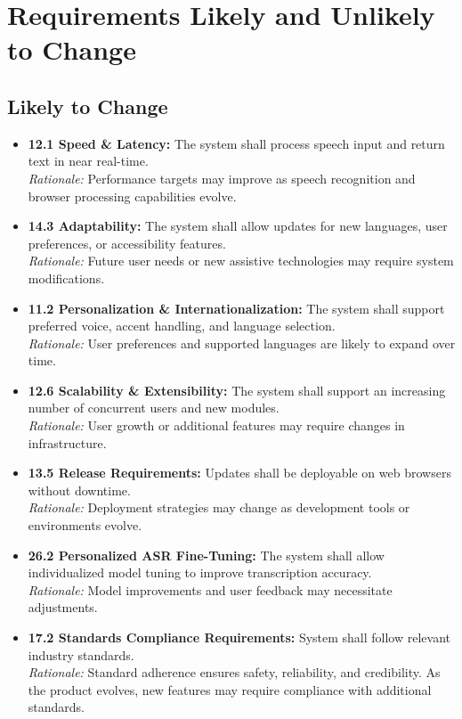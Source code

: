 \documentclass[12pt]{article}
\begin{document}
\section{Requirements Likely and Unlikely to Change}

\subsection{Likely to Change}
\begin{itemize}
    \item \textbf{12.1 Speed \& Latency:} The system shall process speech input and return text in near real-time.\\
    \textit{Rationale:} Performance targets may improve as speech recognition and browser processing capabilities evolve.

    \item \textbf{14.3 Adaptability:} The system shall allow updates for new languages, user preferences, or accessibility features.\\
    \textit{Rationale:} Future user needs or new assistive technologies may require system modifications.

    \item \textbf{11.2 Personalization \& Internationalization:} The system shall support preferred voice, accent handling, and language selection.\\
    \textit{Rationale:} User preferences and supported languages are likely to expand over time.

    \item \textbf{12.6 Scalability \& Extensibility:} The system shall support an increasing number of concurrent users and new modules.\\
    \textit{Rationale:} User growth or additional features may require changes in infrastructure.

    \item \textbf{13.5 Release Requirements:} Updates shall be deployable on web browsers without downtime.\\
    \textit{Rationale:} Deployment strategies may change as development tools or environments evolve.

    \item \textbf{26.2 Personalized ASR Fine-Tuning:} The system shall allow individualized model tuning to improve transcription accuracy.\\
    \textit{Rationale:} Model improvements and user feedback may necessitate adjustments.


    \item \textbf{17.2 Standards Compliance Requirements:} System shall follow relevant industry standards.\\
    \textit{Rationale:} Standard adherence ensures safety, reliability, and credibility. As the product evolves, new features may require compliance with additional standards.
\end{itemize}
\end{document}
